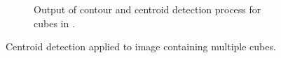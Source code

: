 \begin{figure}[H]
\begin{subfigure}[b]{0.45\textwidth}
         \caption{Output of contour and centroid detection process for cubes in .}
         \label{fig:multiple-cube-centroids}
    \end{subfigure}
    \captionsetup{singlelinecheck = false, justification=justified}
    \caption{Centroid detection applied to image containing multiple cubes.}
    \label{fig:multiple-cube-detection}
\end{figure}

\pendsign

